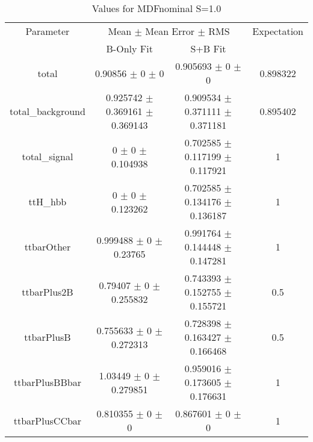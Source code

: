 \begin{table}
\centering
\caption{Values for MDFnominal S=1.0}
\begin{tabular}{cccc}
\toprule
Parameter & \multicolumn{2}{c}{Mean $\pm$ Mean Error $\pm$ RMS} & Expectation\\
 & B-Only Fit & S+B Fit & \\
\midrule
total & \num{0.90856} $\pm$ \num{0} $\pm$ \num{0} & \num{0.905693} $\pm$ \num{0} $\pm$ \num{0} & \num{0.898322}\\
total\_background & \num{0.925742} $\pm$ \num{0.369161} $\pm$ \num{0.369143} & \num{0.909534} $\pm$ \num{0.371111} $\pm$ \num{0.371181} & \num{0.895402}\\
total\_signal & \num{0} $\pm$ \num{0} $\pm$ \num{0.104938} & \num{0.702585} $\pm$ \num{0.117199} $\pm$ \num{0.117921} & \num{1}\\
ttH\_hbb & \num{0} $\pm$ \num{0} $\pm$ \num{0.123262} & \num{0.702585} $\pm$ \num{0.134176} $\pm$ \num{0.136187} & \num{1}\\
ttbarOther & \num{0.999488} $\pm$ \num{0} $\pm$ \num{0.23765} & \num{0.991764} $\pm$ \num{0.144448} $\pm$ \num{0.147281} & \num{1}\\
ttbarPlus2B & \num{0.79407} $\pm$ \num{0} $\pm$ \num{0.255832} & \num{0.743393} $\pm$ \num{0.152755} $\pm$ \num{0.155721} & \num{0.5}\\
ttbarPlusB & \num{0.755633} $\pm$ \num{0} $\pm$ \num{0.272313} & \num{0.728398} $\pm$ \num{0.163427} $\pm$ \num{0.166468} & \num{0.5}\\
ttbarPlusBBbar & \num{1.03449} $\pm$ \num{0} $\pm$ \num{0.279851} & \num{0.959016} $\pm$ \num{0.173605} $\pm$ \num{0.176631} & \num{1}\\
ttbarPlusCCbar & \num{0.810355} $\pm$ \num{0} $\pm$ \num{0} & \num{0.867601} $\pm$ \num{0} $\pm$ \num{0} & \num{1}\\
\bottomrule
\end{tabular}
\end{table}